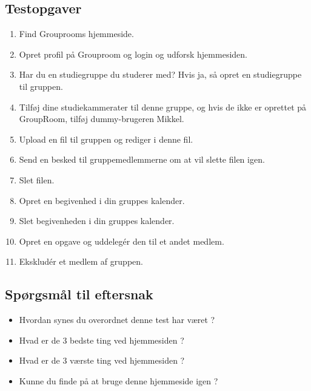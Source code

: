 \documentclass[12pt]{article}
\begin{document}
\subsection{Testopgaver}
\begin{enumerate}
\item Find Grouprooms hjemmeside.
\item Opret profil på Grouproom og login og udforsk hjemmesiden.
\item Har du en studiegruppe du studerer med? Hvis ja, så opret en studiegruppe til gruppen.
\item Tilføj dine studiekammerater til denne gruppe, og hvis de ikke er oprettet på GroupRoom, tilføj dummy-brugeren Mikkel.
\item Upload en fil til gruppen og rediger i denne fil.
\item Send en besked til gruppemedlemmerne om at vil slette filen igen.
\item Slet filen.
\item Opret en begivenhed i din gruppes kalender.
\item Slet begivenheden i din gruppes kalender.
\item Opret en opgave og uddelegér den til et andet medlem.
\item Ekskludér et medlem af gruppen.
\end{enumerate}
\subsection{Spørgsmål til eftersnak}
\begin{itemize}
  \item Hvordan synes du overordnet denne test har været ?
  \item Hvad er de 3 bedste ting ved hjemmesiden ?
  \item Hvad er de 3 værste ting ved hjemmesiden ?
  \item Kunne du finde på at bruge denne hjemmeside igen ?
\end{itemize}
\end{document}
